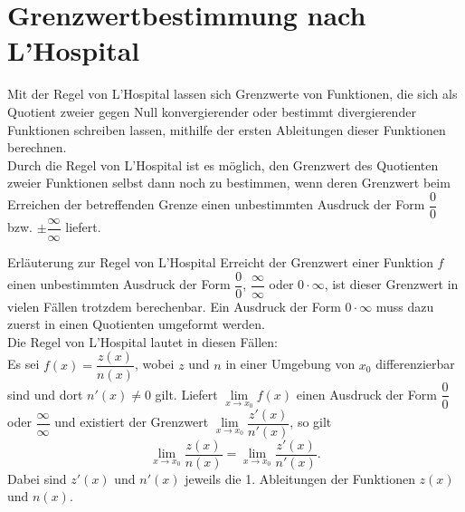 \section{Grenzwertbestimmung nach L'Hospital}
Mit der Regel von L'Hospital lassen sich Grenzwerte von Funktionen, die sich als Quotient zweier gegen Null konvergierender oder bestimmt divergierender Funktionen schreiben lassen, mithilfe der ersten Ableitungen dieser Funktionen berechnen.\\
Durch die Regel von L'Hospital ist es möglich, den Grenzwert des Quotienten zweier Funktionen selbst dann noch zu bestimmen, wenn deren Grenzwert beim Erreichen der betreffenden Grenze einen unbestimmten Ausdruck der Form $\dfrac{0}{0}$ bzw. $\pm\dfrac{\infty}{\infty}$ liefert.
\label{sec:L_Hospital} %
\begin{merke}{Erläuterung zur Regel von L'Hospital}{}
Erreicht der Grenzwert einer Funktion \(f\) einen unbestimmten Ausdruck der Form \(\dfrac{0}{0}\), \(\dfrac{\infty}{\infty}\) oder \(0 \cdot \infty\), ist dieser Grenzwert in vielen Fällen trotzdem berechenbar. Ein Ausdruck der Form \(0\cdot\infty\) muss dazu zuerst in einen Quotienten umgeformt werden.\\
Die Regel von L'Hospital lautet in diesen Fällen: \\
    Es sei \(f(x) = \dfrac{z(x)}{n(x)}\), wobei \(z\) und \(n\) in einer Umgebung von \(x_0\) differenzierbar sind und dort \(n'(x)\neq 0\) gilt. Liefert \(\lim\limits_{x\longrightarrow x_0} f(x)\) einen Ausdruck der Form \(\dfrac{0}{0}\) oder \(\dfrac{\infty}{\infty}\) und existiert der Grenzwert \(\lim\limits _{x\longrightarrow x_0} \dfrac{z'(x)}{n'(x)}\), so gilt \[\lim\limits _{x\longrightarrow x_0} \dfrac{z(x)}{n(x)} = \lim\limits _{x\longrightarrow x_0} \dfrac{z'(x)}{n'(x)}.\] Dabei sind \(z'(x)\) und \(n'(x)\) jeweils die 1. Ableitungen der Funktionen \(z(x)\) und \(n(x)\).

\end{merke}

